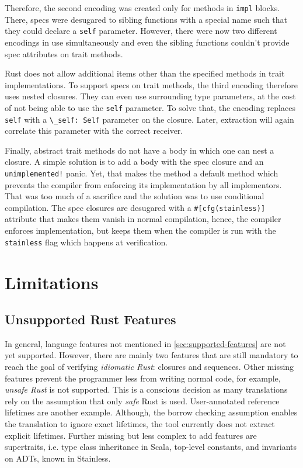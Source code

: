 Therefore, the second encoding was created only for methods in \lstinline!impl!
blocks. There, specs were desugared to sibling functions with a special name
such that they could declare a \lstinline!self! parameter. However, there were
now two different encodings in use simultaneously and even the sibling functions
couldn't provide spec attributes on trait methods.

Rust does not allow additional items other than the specified methods in trait
implementations. To support specs on trait methods, the third encoding therefore
uses nested closures. They can even use surrounding type parameters, at the cost
of not being able to use the \lstinline!self! parameter. To solve that, the
encoding replaces \lstinline!self! with a \passthrough{\lstinline!\_self: Self!}
parameter on the closure. Later, extraction will again correlate this parameter
with the correct receiver.

Finally, abstract trait methods do not have a body in which one can nest a
closure. A simple solution is to add a body with the spec closure and an
\lstinline"unimplemented!" panic. Yet, that makes the method a default method
which prevents the compiler from enforcing its implementation by all
implementors. That  was too much of a sacrifice and the solution was to use
conditional compilation. The spec closures are desugared with a
\lstinline!#[cfg(stainless)]! attribute that makes them vanish in normal
compilation, hence, the compiler enforces implementation, but keeps them when
the compiler is run with the \lstinline!stainless! flag which happens at
verification.



\section{Limitations}
\label{impl-limitations}

\subsection{Unsupported Rust Features}

In general, language features not mentioned in \autoref{sec:supported-features}
are not yet supported. However, there are mainly two features that are still
mandatory to reach the goal of verifying \emph{idiomatic Rust}: closures and
sequences. Other missing features prevent the programmer less from writing
normal code, for example, \emph{unsafe Rust} is not supported. This is a
conscious decision as many translations rely on the assumption that only
\emph{safe} Rust is used. User-annotated reference lifetimes are another
example. Although, the borrow checking assumption enables the translation to
ignore exact lifetimes, the tool currently does not extract explicit lifetimes.
Further missing but less complex to add features are supertraits, i.e. type
class inheritance in Scala, top-level constants, and invariants on ADTs, known
in Stainless.

